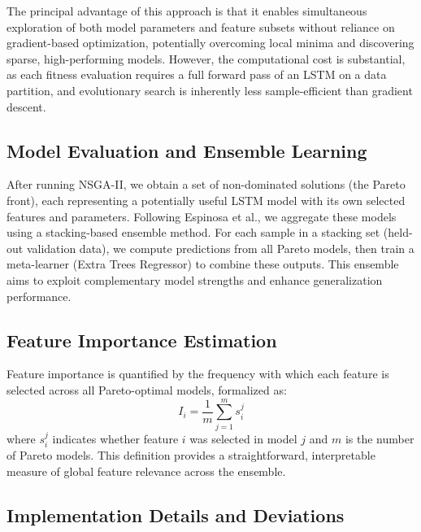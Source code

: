 \documentclass[12pt]{article}
\begin{document}
The principal advantage of this approach is that it enables simultaneous exploration of both model parameters and feature subsets without reliance on gradient-based optimization, potentially overcoming local minima and discovering sparse, high-performing models. However, the computational cost is substantial, as each fitness evaluation requires a full forward pass of an LSTM on a data partition, and evolutionary search is inherently less sample-efficient than gradient descent.

\subsection{Model Evaluation and Ensemble Learning}

After running NSGA-II, we obtain a set of non-dominated solutions (the Pareto front), each representing a potentially useful LSTM model with its own selected features and parameters. Following Espinosa et al., we aggregate these models using a stacking-based ensemble method. For each sample in a stacking set (held-out validation data), we compute predictions from all Pareto models, then train a meta-learner (Extra Trees Regressor) to combine these outputs. This ensemble aims to exploit complementary model strengths and enhance generalization performance.

\subsection{Feature Importance Estimation}

Feature importance is quantified by the frequency with which each feature is selected across all Pareto-optimal models, formalized as:
\[
I_i = \frac{1}{m} \sum_{j=1}^m s^j_i
\]
where $s^j_i$ indicates whether feature $i$ was selected in model $j$ and $m$ is the number of Pareto models. This definition provides a straightforward, interpretable measure of global feature relevance across the ensemble.

\subsection{Implementation Details and Deviations}
\end{document}
